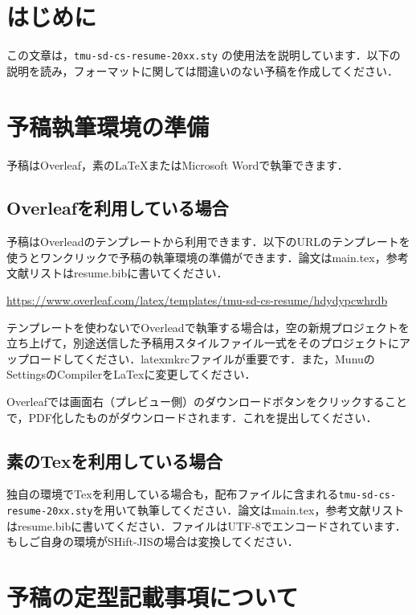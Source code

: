 \documentclass[platex,dvipdfmx]{jsarticle}
\begin{document}
\mktitle

\section{はじめに}
この文章は，{\tt tmu-sd-cs-resume-20xx.sty} の使用法を説明しています．以下の説明を読み，フォーマットに関しては間違いのない予稿を作成してください．

\section{予稿執筆環境の準備}

予稿はOverleaf，素の{\LaTeX}またはMicrosoft Wordで執筆できます．

\subsection{Overleafを利用している場合}

予稿はOverleadのテンプレートから利用できます．以下のURLのテンプレートを使うとワンクリックで予稿の執筆環境の準備ができます．論文はmain.tex，参考文献リストはresume.bibに書いてください．

\url{https://www.overleaf.com/latex/templates/tmu-sd-cs-resume/hdydypcwhrdb}

テンプレートを使わないでOverleadで執筆する場合は，空の新規プロジェクトを立ち上げて，別途送信した予稿用スタイルファイル一式をそのプロジェクトにアップロードしてください．latexmkrcファイルが重要です．また，MunuのSettingsのCompilerをLaTexに変更してください．

Overleafでは画面右（プレビュー側）のダウンロードボタンをクリックすることで，PDF化したものがダウンロードされます．これを提出してください．

\subsection{素のTexを利用している場合}

独自の環境でTexを利用している場合も，配布ファイルに含まれる{\tt tmu-sd-cs-resume-20xx.sty}を用いて執筆してください．論文はmain.tex，参考文献リストはresume.bibに書いてください．ファイルはUTF-8でエンコードされています．もしご自身の環境がSHift-JISの場合は変換してください．

\section{予稿の定型記載事項について}
\end{document}
